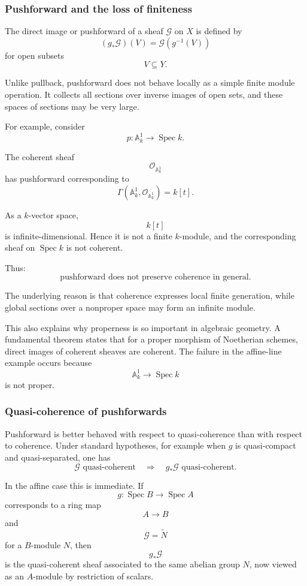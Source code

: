 \documentclass[12pt,a4paper]{article}
\DeclareMathOperator{\Spec}{Spec}
\newcommand{\OO}{\mathcal{O}}
\providecommand{\Spec}{\operatorname{Spec}}
\providecommand{\A}{\mathbb A}
\theoremstyle{notespace}
\begin{document}
\subsubsection{Pushforward and the loss of finiteness}

The direct image or pushforward of a sheaf \(\mathcal{G}\) on \(X\) is defined by
\[
(g_*\mathcal{G})(V)
=
\mathcal{G}(g^{-1}(V))
\]
for open subsets
\[
V\subseteq Y.
\]

Unlike pullback, pushforward does not behave locally as a simple finite module operation. It collects all sections over inverse images of open sets, and these spaces of sections may be very large.

For example, consider
\[
p:\A^1_k\longrightarrow\Spec k.
\]

The coherent sheaf
\[
\OO_{\A^1_k}
\]
has pushforward corresponding to
\[
\Gamma(\A^1_k,\OO_{\A^1_k})
=
k[t].
\]

As a \(k\)-vector space,
\[
k[t]
\]
is infinite-dimensional. Hence it is not a finite \(k\)-module, and the corresponding sheaf on \(\Spec k\) is not coherent.

Thus:
\[
\boxed{
	\text{pushforward does not preserve coherence in general.}
}
\]

The underlying reason is that coherence expresses local finite generation, while global sections over a nonproper space may form an infinite module.

This also explains why properness is so important in algebraic geometry. A fundamental theorem states that for a proper morphism of Noetherian schemes, direct images of coherent sheaves are coherent. The failure in the affine-line example occurs because
\[
\A^1_k\longrightarrow\Spec k
\]
is not proper.

\subsubsection{Quasi-coherence of pushforwards}

Pushforward is better behaved with respect to quasi-coherence than with respect to coherence. Under standard hypotheses, for example when \(g\) is quasi-compact and quasi-separated, one has
\[
\mathcal{G}\text{ quasi-coherent}
\quad\Longrightarrow\quad
g_*\mathcal{G}\text{ quasi-coherent}.
\]

In the affine case this is immediate. If
\[
g:\Spec B\longrightarrow\Spec A
\]
corresponds to a ring map
\[
A\longrightarrow B
\]
and
\[
\mathcal{G}=\widetilde{N}
\]
for a \(B\)-module \(N\), then
\[
g_*\mathcal{G}
\]
is the quasi-coherent sheaf associated to the same abelian group \(N\), now viewed as an \(A\)-module by restriction of scalars.
\end{document}
